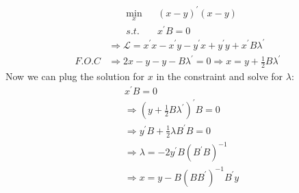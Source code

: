 \documentclass[hidelinks,12pt]{article}
\begin{document}
\section{}
\begin{equation*}
    \begin{aligned}
        & \underset{x }{\min}
        & & (x-y)^{'} (x-y) \\
        & s.t. 
        & & x^{'} B = 0 
    \end{aligned}
\end{equation*}
\begin{equation*}
    \begin{aligned}
    &\Rightarrow \mathcal{L} = x^{'} x - x^{'} y - y^{'} x + y^{'} y +  x^{'} B \lambda^{'}\\
    F.O.C& \Rightarrow 2x - y - y - B \lambda^{'} = 0 \Rightarrow x = y + \frac{1}{2} B \lambda^{'} 
\end{aligned}
\end{equation*}
Now we can plug the solution for $x$ in the constraint and solve for $\lambda$:
\begin{equation*}
    \begin{aligned}
        & x^{'} B = 0 \\
        & \Rightarrow (y + \frac{1}{2} B \lambda^{'})^{'} B = 0 \\
        & \Rightarrow y^{'} B + \frac{1}{2} \lambda B^{'} B = 0 \\
        & \Rightarrow \lambda = -2 y^{'} B (B^{'} B)^{-1} \\
        & \Rightarrow x = y - B (B B^{'})^{-1} B^{'} y
    \end{aligned}
\end{equation*}
\end{document}
